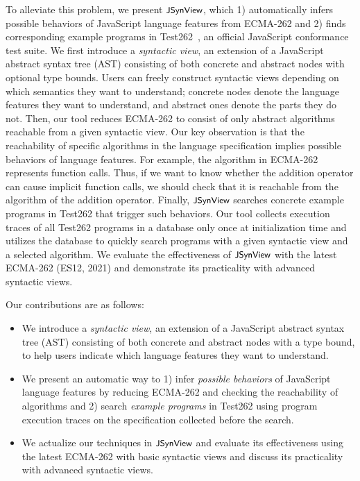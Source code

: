 To alleviate this problem, we present $\textsf{\small JSynView}$, which 1) automatically infers
possible behaviors of JavaScript language features from ECMA-262 and 2) finds
corresponding example programs in Test262~\cite{test262}, an official JavaScript
conformance test suite.  We first introduce a \textit{syntactic view}, an
extension of a JavaScript abstract syntax tree (AST) consisting of both concrete
and abstract nodes with optional type bounds.  Users can freely construct
syntactic views depending on which semantics they want to understand; concrete
nodes denote the language features they want to understand, and abstract ones
denote the parts they do not.  Then, our tool reduces ECMA-262 to consist of
only abstract algorithms reachable from a given syntactic view.  Our key
observation is that the reachability of specific algorithms in the language
specification implies possible behaviors of language features.  For example, the
 algorithm in ECMA-262 represents function calls.  Thus, if we want
to know whether the addition operator can cause implicit function calls, we
should check that it is reachable from the  algorithm of the
addition operator.  Finally, $\textsf{\small JSynView}$ searches concrete example programs in
Test262 that trigger such behaviors.  Our tool collects execution traces of all
Test262 programs in a database only once at initialization time and utilizes the
database to quickly search programs with a given syntactic view and a selected
algorithm.  We evaluate the effectiveness of $\textsf{\small JSynView}$ with the latest ECMA-262
(ES12, 2021) and demonstrate its practicality with  advanced
syntactic views.

Our contributions are as follows:
\begin{itemize}
  \item We introduce a \textit{syntactic view}, an extension of a JavaScript
    abstract syntax tree (AST) consisting of both concrete and abstract nodes
    with a type bound, to help users indicate which language features they want
    to understand.

  \item We present an automatic way to 1) infer \textit{possible behaviors} of
    JavaScript language features by reducing ECMA-262 and checking the
    reachability of algorithms and 2) search \textit{example programs} in
    Test262 using program execution traces on the specification collected before
    the search.

  \item We actualize our techniques in $\textsf{\small JSynView}$ and evaluate its effectiveness
    using the latest ECMA-262 with  basic syntactic views and discuss
    its practicality with  advanced syntactic views.
\end{itemize}
